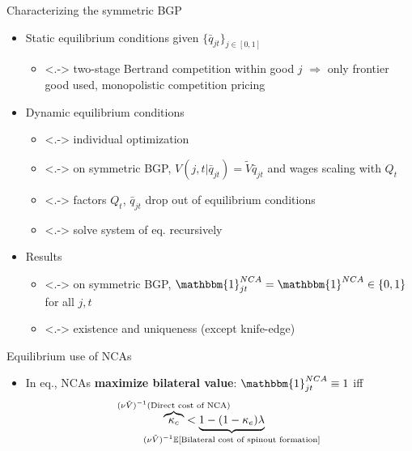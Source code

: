 \documentclass[english,usenames,dvipsnames]{beamer}
\begin{document}
\begin{frame}{Characterizing the symmetric BGP}\label{closing_the_model}
	\begin{itemize}
		\item<+-> Static equilibrium conditions given $\{\bar{q}_{jt}\}_{j \in [0,1]}$ \hyperlink{static_eq_conditions}{}
		\begin{itemize}
			\item<.-> two-stage Bertrand competition within good $j$ $\Rightarrow$ only frontier good used, monopolistic competition pricing \hyperlink{two_stage_bertrand}{}
		\end{itemize}
		\medskip
		\item<+-> Dynamic equilibrium conditions
		\begin{itemize}
			\item<.-> individual optimization \hyperlink{HJB_incumbent}{} \hyperlink{household_optimization}{} 
			\item<.-> on symmetric BGP, $V(j,t|\bar{q}_{jt}) = \tilde{V} \bar{q}_{jt}$ and wages scaling with $Q_t$  \hyperlink{proposition:hjb_scaling}{} 
			\item<.-> factors $Q_t$, $\bar{q}_{jt}$ drop out of equilibrium conditions 
			\item<.-> solve system of eq. recursively 
			\hyperlink{eq_innovation_and_growth}{} 
		\end{itemize}
		\medskip
		\item<+-> Results 
		\begin{itemize}
			\item<.-> on symmetric BGP, $\mathbbm{1}^{NCA}_{jt} = \mathbbm{1}^{NCA} \in \{0,1\}$ for all $j,t$
			\item<.-> existence and uniqueness (except knife-edge) \hyperlink{existence_and_uniqueness}{} 
		\end{itemize}
	\end{itemize}
\end{frame}

\begin{frame}{Equilibrium use of NCAs}\label{use_of_ncas}
	\begin{itemize}
		\item In eq., NCAs \alert{\textbf{maximize bilateral value}}: $\mathbbm{1}^{NCA}_{jt} \equiv 1$ iff
		\begin{align*}
		\overbrace{\kappa_c}^{\mathclap{(\nu \tilde{V})^{-1} (\text{Direct cost of NCA})}} &< \underbrace{1 - (1-\kappa_e) \lambda}_{\mathclap{(\nu\tilde{V})^{-1}\mathbb{E}[\text{Bilateral cost of spinout formation}]}}
		\end{align*}
		\hyperlink{use_of_ncas_details}{}
	\end{itemize}
\end{frame}
\end{document}
